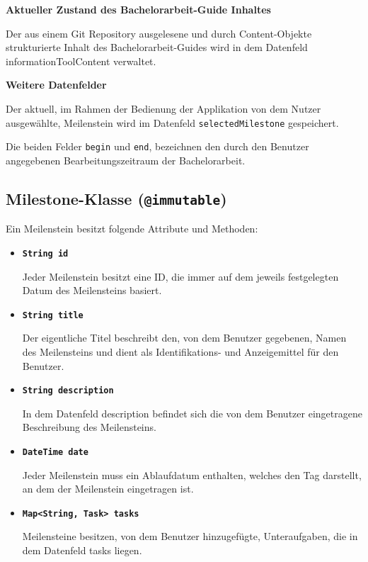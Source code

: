 \documentclass[bibliography=totoc,listof=totoc,BCOR=5mm,DIV=12,oneside]{scrbook}
\begin{document}
{\par \bigskip \textbf{Aktueller Zustand des Bachelorarbeit-Guide Inhaltes}
\par Der aus einem Git Repository ausgelesene und durch Content-Objekte strukturierte Inhalt des Bachelorarbeit-Guides wird in dem Datenfeld informationToolContent verwaltet.

\par \bigskip \textbf{Weitere Datenfelder}
\par Der aktuell, im Rahmen der Bedienung der Applikation von dem Nutzer ausgewählte, Meilenstein wird im Datenfeld \texttt{selectedMilestone} gespeichert. 
\par \medskip Die beiden Felder \texttt{begin} und \texttt{end}, bezeichnen den durch den Benutzer angegebenen Bearbeitungszeitraum der Bachelorarbeit.

\newpage
\subsection{Milestone-Klasse (\texttt{@immutable})}
\par Ein Meilenstein besitzt folgende Attribute und Methoden:

\begin{itemize}

\item[] \texttt{\textbf{String id}}
\par Jeder Meilenstein besitzt eine ID, die immer auf dem jeweils festgelegten Datum des Meilensteins basiert.

\item[] \texttt{\textbf{String title}}
\par Der eigentliche Titel beschreibt den, von dem Benutzer gegebenen, Namen des Meilensteins und dient als Identifikations- und Anzeigemittel für den Benutzer.

\item[] \texttt{\textbf{String description}}
\par In dem Datenfeld description befindet sich die von dem Benutzer eingetragene Beschreibung des Meilensteins.

\item[] \texttt{\textbf{DateTime date}}
\par Jeder Meilenstein muss ein Ablaufdatum enthalten, welches den Tag darstellt, an dem der Meilenstein eingetragen ist.

\item[] \texttt{\textbf{Map<String, Task> tasks}}
\par Meilensteine besitzen, von dem Benutzer hinzugefügte, Unteraufgaben, die in dem Datenfeld tasks liegen.


\end{itemize}}
\end{document}
